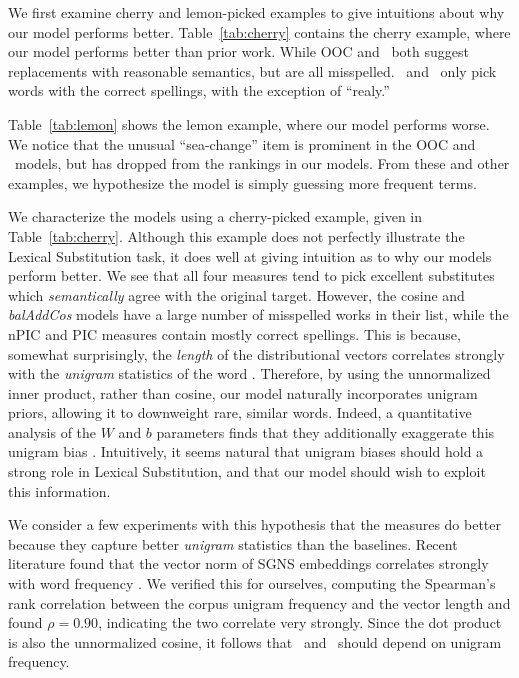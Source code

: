 We first examine cherry and lemon-picked examples to give intuitions about why
our model performs better. Table~\ref{tab:cherry} contains the cherry example,
where our model performs better than prior work. While OOC
and \balAddCos~both suggest replacements with reasonable semantics, but are
all misspelled. \ourmeas~and \ourmeasparam~only pick words with the correct spellings,
with the exception of ``realy.''

Table~\ref{tab:lemon} shows the lemon example, where our model performs worse.
We notice that the unusual ``sea-change'' item is prominent in the OOC and
\balAddCos~models, but has dropped from the rankings in our models. From
these and other examples, we hypothesize the model is simply guessing more
frequent terms.

\hardline
We characterize the models using a cherry-picked example,
given in Table~\ref{tab:cherry}. Although this example does not perfectly illustrate
the Lexical Substitution task, it does well at giving intuition as to why our
models perform better. We see that all four measures
tend to pick excellent substitutes which {\em semantically} agree with the
original target. However, the cosine and {\em balAddCos} models have a large number of
misspelled works in their list, while the nPIC and PIC measures contain
mostly correct spellings. This is because, somewhat surprisingly, the {\em
length} of the distributional vectors correlates strongly with the {\em
unigram} statistics of the word \cite{wilson:2015:arxiv}.
Therefore, by using the unnormalized inner
product, rather than cosine, our model naturally incorporates unigram priors,
allowing it to downweight rare, similar words. Indeed, a quantitative analysis
of the $W$ and $b$ parameters finds that they additionally exaggerate this
unigram bias \cite{roller:2016:naacl}.
Intuitively, it seems natural that unigram biases should hold a strong role in
Lexical Substitution, and that our model should wish to exploit this
information.


\hardline



We consider a few experiments with this hypothesis that the measures do better
because they capture better {\em unigram} statistics than the baselines. Recent literature found that the vector
norm of SGNS embeddings correlates strongly with word frequency
\cite{wilson:2015:arxiv}. We verified this for ourselves, computing the Spearman's
rank correlation between the corpus unigram frequency and the vector length
and found $\rho = 0.90$, indicating the two correlate very strongly. Since the
dot product is also the unnormalized cosine, it follows that \ourmeas~and
\ourmeasparam~should depend on unigram frequency.

